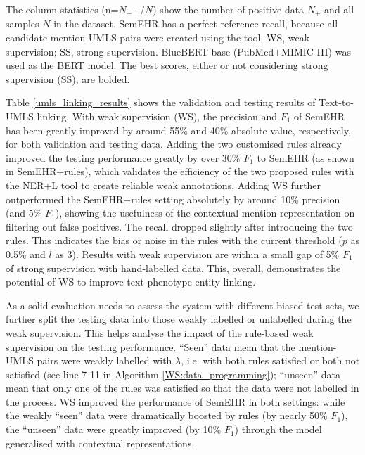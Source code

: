 \documentclass[twocolumn]{bmcart}
\begin{document}
\begin{table*}[th]
\begin{threeparttable}
\begin{tabular}{llll|lll||lll|lll}
\cline{1-13}
\end{tabular}
\begin{tablenotes}
\item The column statistics (n=$N_+$+/$N$) show the number of positive data $N_+$ and all samples $N$ in the dataset. SemEHR has a perfect reference recall, because all candidate mention-UMLS pairs were created using the tool. WS, weak supervision; SS, strong supervision. BlueBERT-base (PubMed+MIMIC-III) was used as the BERT model. The best scores, either or not considering strong supervision (SS), are bolded.
\end{tablenotes}
\end{threeparttable}
\end{table*}

Table \ref{umls_linking_results} shows the validation and testing results of Text-to-UMLS linking. With weak supervision (WS), the precision and $F_1$ of SemEHR has been greatly improved by around 55\% and 40\% absolute value, respectively, for both validation and testing data. Adding the two customised rules already improved the testing performance greatly by over 30\% $F_1$ to SemEHR (as shown in SemEHR+rules), which validates the efficiency of the two proposed rules with the NER+L tool to create reliable weak annotations. Adding WS further outperformed the SemEHR+rules setting absolutely by around 10\% precision (and 5\% $F_1$), showing the usefulness of the contextual mention representation on filtering out false positives. The recall dropped slightly after introducing the two rules. This indicates the bias or noise in the rules with the current threshold ($p$ as 0.5\% and $l$ as 3). Results with weak supervision are within a small gap of 5\% $F_1$ of strong supervision with hand-labelled data. This, overall, demonstrates the potential of WS to improve text phenotype entity linking.

As a solid evaluation needs to assess the system with different biased test sets, we further split the testing data into those weakly labelled or unlabelled during the weak supervision. This helps analyse the impact of the rule-based weak supervision on the testing performance. ``Seen'' data mean that the mention-UMLS pairs were weakly labelled with $\lambda$, i.e. with both rules satisfied or both not satisfied (see line 7-11 in Algorithm \ref{WS:data_programming}); ``unseen'' data mean that only one of the rules was satisfied so that the data were not labelled in the process. WS improved the performance of SemEHR in both settings: while the weakly ``seen'' data were dramatically boosted by rules (by nearly 50\% $F_1$), the ``unseen'' data were greatly improved (by 10\% $F_1$) through the model generalised with contextual representations. 
\end{document}
